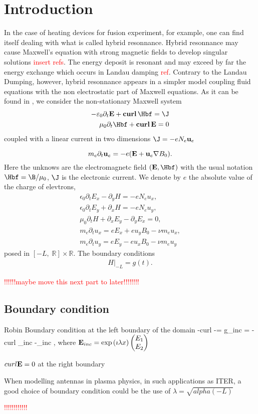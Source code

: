 \section{Introduction}



 In the case of heating devices for fusion experiment, for example, one can find itself dealing with what is called hybrid resonnance. Hybrid resonnance may cause Maxwell's equation with strong magnetic fields to develop singular solutions \textcolor{red}{insert refs}. The energy deposit is resonant and may exceed by far the energy exchange which occurs in Landau damping \textcolor{red}{ref}. Contrary to the Landau Dumping, however, hybrid resonnance appears in a simpler model coupling fluid equations with the non electrostatic part of Maxwell equations.
 As it can be found in \cite{stable_yee_plasma_current}, we consider the non-stationary Maxwell system  
 \begin{align}
 -\varepsilon_0 \partial_t \E + \curl\, \Hbf = \J\\
 \mu_0 \partial_t \Hbf + \curl\,  \E = 0
 \end{align}
 coupled with a linear current in two dimensions $\J = -eN_e \ubf_e$
 
 \[
 m_e \partial_t {\bf u}_e =-e ({\bf E} +{\bf u}_e \nabla B_0).
 \]
 Here the unknows are the electromagnetc field $(\E,\Hbf)$ with the usual notation $\Hbf = \B/\mu_0$, $\J$ is the electronic current. We denote by $e$ the absolute value of the charge of elevtrons, 
  \begin{align*}
\epsilon_0\partial_t E_{x}-\partial_y H=-eN_e u_x,\\
\epsilon_0\partial_t E_{y}+\partial_x H=-eN_e u_y,\\
\mu_0\partial_t H+\partial_x E_y-\partial_y E_x=0,\\
m_e\partial_t u_x=eE_x+eu_yB_0-\nu m_e u_x,\\
m_e\partial_t u_y=eE_y-eu_xB_0-\nu m_e u_y
\end{align*}
posed in $[-L,\; \mathbb{R}]\times \mathbb{R}$. The boundary conditions 
\begin{align*}
 H|_{-L}=g(t).
\end{align*}

\textcolor{red}{!!!!!!maybe move this next part to later!!!!!!!!}
\subsection{Boundary condition}
Robin Boundary condition at the left boundary of the domain
\be
-curl \E -\imath \lambda\E \wedge \n = g_{inc} = -curl \E_{inc} -\imath \lambda\E_{inc} \wedge \n,
\ee
where  ${\bf E}_{inc} = \exp \left(\imath \lambda x\right)\begin{pmatrix} E_1\\ E_2 \end{pmatrix}$

$curl {\bf E} = 0$ at the right boundary
\begin{remark}
When modelling antennas in plasma physics, in such applications as ITER, a good choice of boundary condition could be the use of $\lambda = \sqrt{alpha(-L)}$
\end{remark}
\textcolor{red}{!!!!!!!!!!!!}